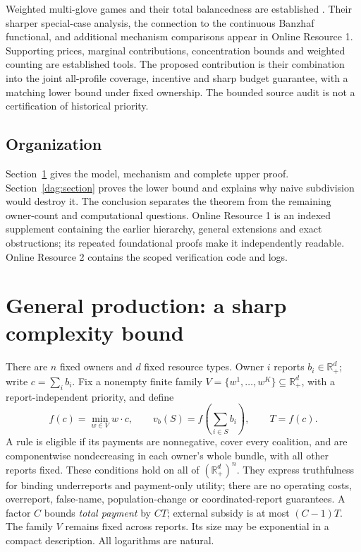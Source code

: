 \documentclass[11pt]{article}
\theoremstyle{definition}\newtheorem{definition}[theorem]{Definition}
\theoremstyle{remark}\newtheorem{remark}[theorem]{Remark}
\newcommand{\R}{\mathbb R}
\begin{document}
Weighted multi-glove games and their total balancedness are established
\citep{MorettiNorde}. Their sharper special-case analysis, the connection to
the continuous Banzhaf functional, and additional mechanism comparisons appear
in Online Resource 1. Supporting prices, marginal contributions, concentration
bounds and weighted counting are established tools. The proposed contribution
is their combination into the joint all-profile coverage, incentive and sharp
budget guarantee, with a matching lower bound under fixed ownership. The
bounded source audit is not a certification of historical priority.

\subsection{Organization}
Section~\ref{prod:section} gives the model, mechanism and complete upper proof.
Section~\ref{dag:section} proves the lower bound and explains why naive
subdivision would destroy it. The conclusion separates the theorem from the
remaining owner-count and computational questions. Online Resource 1 is an
indexed supplement containing the earlier hierarchy, general extensions and
exact obstructions; its repeated foundational proofs make it independently
readable. Online Resource 2 contains the scoped verification code and logs.

\section{General production: a sharp complexity bound}\label{prod:section}
There are $n$ fixed owners and $d$ fixed resource types. Owner $i$ reports
$b_i\in\R_+^d$; write $c=\sum_i b_i$. Fix a nonempty finite family
$V=\{w^1,\ldots,w^K\}\subseteq\R_+^d$, with a report-independent priority,
and define
\[
 f(c)=\min_{w\in V}w\cdot c,\qquad
 v_b(S)=f\left(\sum_{i\in S}b_i\right),\qquad T=f(c).
\]
A rule is eligible if its payments are nonnegative, cover every coalition,
and are componentwise nondecreasing in each owner's whole bundle, with all
other reports fixed. These conditions hold on all of $(\R_+^d)^n$.
They express truthfulness for binding underreports and payment-only utility;
there are no operating costs, overreport, false-name, population-change or
coordinated-report guarantees. A factor $C$ bounds \emph{total payment} by
$CT$; external subsidy is at most $(C-1)T$. The family $V$ remains fixed
across reports. Its size may be exponential in a compact description. All logarithms are natural.
\end{document}
